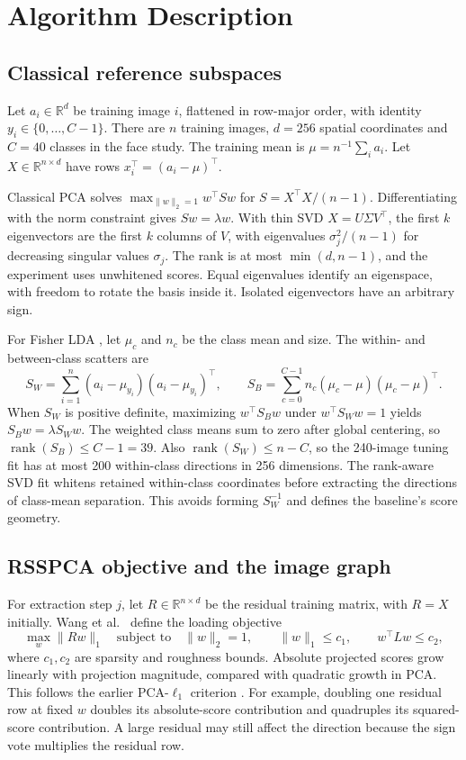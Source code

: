 \section{Algorithm Description}
\label{sec:method}
\subsection{Classical reference subspaces}

Let $a_i\in\mathbb R^d$ be training image $i$, flattened in row-major order, with identity $y_i\in\{0,\dots,C-1\}$. There are $n$ training images, $d=256$ spatial coordinates and $C=40$ classes in the face study. The training mean is $\mu=n^{-1}\sum_i a_i$. Let $X\in\mathbb R^{n\times d}$ have rows $x_i^\top=(a_i-\mu)^\top$.

Classical PCA \citep{pearson1901} solves $\max_{\|w\|_2=1} w^\top S w$ for $S=X^\top X/(n-1)$. Differentiating with the norm constraint gives $Sw=\lambda w$. With thin SVD $X=U\Sigma V^\top$, the first $k$ eigenvectors are the first $k$ columns of $V$, with eigenvalues $\sigma_j^2/(n-1)$ for decreasing singular values $\sigma_j$. The rank is at most $\min(d,n-1)$, and the experiment uses unwhitened scores. Equal eigenvalues identify an eigenspace, with freedom to rotate the basis inside it. Isolated eigenvectors have an arbitrary sign.

For Fisher LDA \citep{fisher1936}, let $\mu_c$ and $n_c$ be the class mean and size. The within- and between-class scatters are
\[
 S_W=\sum_{i=1}^{n}(a_i-\mu_{y_i})(a_i-\mu_{y_i})^\top,\qquad
 S_B=\sum_{c=0}^{C-1}n_c(\mu_c-\mu)(\mu_c-\mu)^\top.
\]
When $S_W$ is positive definite, maximizing $w^\top S_B w$ under $w^\top S_Ww=1$ yields $S_Bw=\lambda S_Ww$. The weighted class means sum to zero after global centering, so $\operatorname{rank}(S_B)\le C-1=39$. Also $\operatorname{rank}(S_W)\le n-C$, so the 240-image tuning fit has at most 200 within-class directions in 256 dimensions. The rank-aware SVD fit whitens retained within-class coordinates before extracting the directions of class-mean separation. This avoids forming $S_W^{-1}$ and defines the baseline's score geometry.

\subsection{RSSPCA objective and the image graph}

For extraction step $j$, let $R\in\mathbb R^{n\times d}$ be the residual training matrix, with $R=X$ initially. Wang et al.\ \citep{wang2025} define the loading objective
\begin{equation}
 \max_w \|Rw\|_1
 \quad\text{subject to}\quad
 \|w\|_2=1,\qquad \|w\|_1\le c_1,\qquad w^\top Lw\le c_2 ,
 \label{eq:objective}
\end{equation}
where $c_1,c_2$ are sparsity and roughness bounds. Absolute projected scores grow linearly with projection magnitude, compared with quadratic growth in PCA. This follows the earlier PCA-$\ell_1$ criterion \citep{kwak2008}. For example, doubling one residual row at fixed $w$ doubles its absolute-score contribution and quadruples its squared-score contribution. A large residual may still affect the direction because the sign vote multiplies the residual row.

